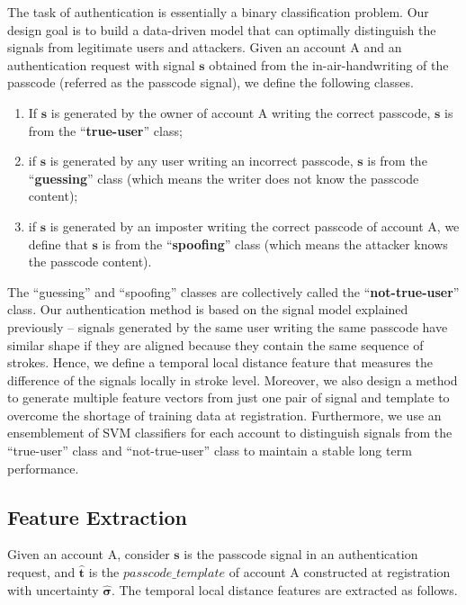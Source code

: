 \documentclass[conference]{IEEEtran}
\begin{document}
The task of authentication is essentially a binary classification problem. Our design goal is to build a data-driven model that can optimally distinguish the signals from legitimate users and attackers. Given an account A and an authentication request with signal $\mathbf{s}$ obtained from the in-air-handwriting of the passcode (referred as the passcode signal), we define the following classes. 

\begin{enumerate}
\item If $\mathbf{s}$ is generated by the owner of account A writing the correct passcode, $\mathbf{s}$ is from the ``\textbf{true-user}'' class; 
\item if $\mathbf{s}$ is generated by any user writing an incorrect passcode, $\mathbf{s}$ is from the ``\textbf{guessing}'' class (which means the writer does not know the passcode content); 
\item if $\mathbf{s}$ is generated by an imposter writing the correct passcode of account A, we define that $\mathbf{s}$ is from the ``\textbf{spoofing}'' class (which means the attacker knows the passcode content).
\end{enumerate}

The ``guessing'' and ``spoofing'' classes are collectively called the ``\textbf{not-true-user}'' class. Our authentication method is based on the signal model explained previously -- signals generated by the same user writing the same passcode have similar shape if they are aligned because they contain the same sequence of strokes. Hence, we define a temporal local distance feature that measures the difference of the signals locally in stroke level. Moreover, we also design a method to generate multiple feature vectors from just one pair of signal and template to overcome the shortage of training data at registration. Furthermore, we use an ensemblement of SVM classifiers for each account to distinguish signals from the ``true-user'' class and ``not-true-user'' class to maintain a stable long term performance.

\subsection{Feature Extraction}

Given an account A, consider $\mathbf{s}$ is the passcode signal in an authentication request, and $\hat{\mathbf{t}}$ is the $passcode\_template$ of account A constructed at registration with uncertainty $\hat{\boldsymbol{\sigma}}$. The temporal local distance features are extracted as follows. 
\end{document}
